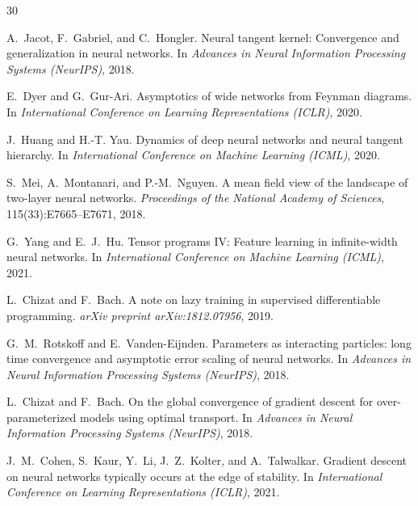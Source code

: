 \documentclass[11pt]{article}
\theoremstyle{definition}
\begin{document}
\begin{thebibliography}{30}

A.~Jacot, F.~Gabriel, and C.~Hongler.
\newblock Neural tangent kernel: Convergence and generalization in neural networks.
\newblock In \emph{Advances in Neural Information Processing Systems (NeurIPS)}, 2018.

E.~Dyer and G.~Gur-Ari.
\newblock Asymptotics of wide networks from {F}eynman diagrams.
\newblock In \emph{International Conference on Learning Representations (ICLR)}, 2020.

J.~Huang and H.-T. Yau.
\newblock Dynamics of deep neural networks and neural tangent hierarchy.
\newblock In \emph{International Conference on Machine Learning (ICML)}, 2020.

S.~Mei, A.~Montanari, and P.-M.~Nguyen.
\newblock A mean field view of the landscape of two-layer neural networks.
\newblock \emph{Proceedings of the National Academy of Sciences}, 115(33):E7665--E7671, 2018.

G.~Yang and E.~J.~Hu.
\newblock Tensor programs {IV}: Feature learning in infinite-width neural networks.
\newblock In \emph{International Conference on Machine Learning (ICML)}, 2021.

L.~Chizat and F.~Bach.
\newblock A note on lazy training in supervised differentiable programming.
\newblock \emph{arXiv preprint arXiv:1812.07956}, 2019.

G.~M.~Rotskoff and E.~Vanden-Eijnden.
\newblock Parameters as interacting particles: long time convergence and asymptotic error scaling of neural networks.
\newblock In \emph{Advances in Neural Information Processing Systems (NeurIPS)}, 2018.

L.~Chizat and F.~Bach.
\newblock On the global convergence of gradient descent for over-parameterized models using optimal transport.
\newblock In \emph{Advances in Neural Information Processing Systems (NeurIPS)}, 2018.

J.~M.~Cohen, S.~Kaur, Y.~Li, J.~Z.~Kolter, and A.~Talwalkar.
\newblock Gradient descent on neural networks typically occurs at the edge of stability.
\newblock In \emph{International Conference on Learning Representations (ICLR)}, 2021.


\end{thebibliography}
\end{document}
